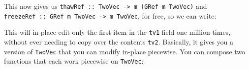 \documentclass[]{article}
\newenvironment{Shaded}{}{}
\newcommand{\DataTypeTok}[1]{\textcolor[rgb]{0.56,0.13,0.00}{#1}}
\newcommand{\DecValTok}[1]{\textcolor[rgb]{0.25,0.63,0.44}{#1}}
\newcommand{\KeywordTok}[1]{\textcolor[rgb]{0.00,0.44,0.13}{\textbf{#1}}}
\newcommand{\NormalTok}[1]{#1}
\newcommand{\OperatorTok}[1]{\textcolor[rgb]{0.40,0.40,0.40}{#1}}
\newcommand{\OtherTok}[1]{\textcolor[rgb]{0.00,0.44,0.13}{#1}}
\begin{document}
This now gives us
\texttt{thawRef\ ::\ TwoVec\ -\textgreater{}\ m\ (GRef\ m\ TwoVec)} and
\texttt{freezeRef\ ::\ GRef\ m\ TwoVec\ -\textgreater{}\ m\ TwoVec}, for free,
so we can write:

\begin{Shaded}
\end{Shaded}

This will in-place edit only the first item in the \texttt{tv1} field one
million times, without ever needing to copy over the contents \texttt{tv2}.
Basically, it gives you a version of \texttt{TwoVec} that you can modify
in-place piecewise. You can compose two functions that each work piecewise on
\texttt{TwoVec}:
\end{document}
